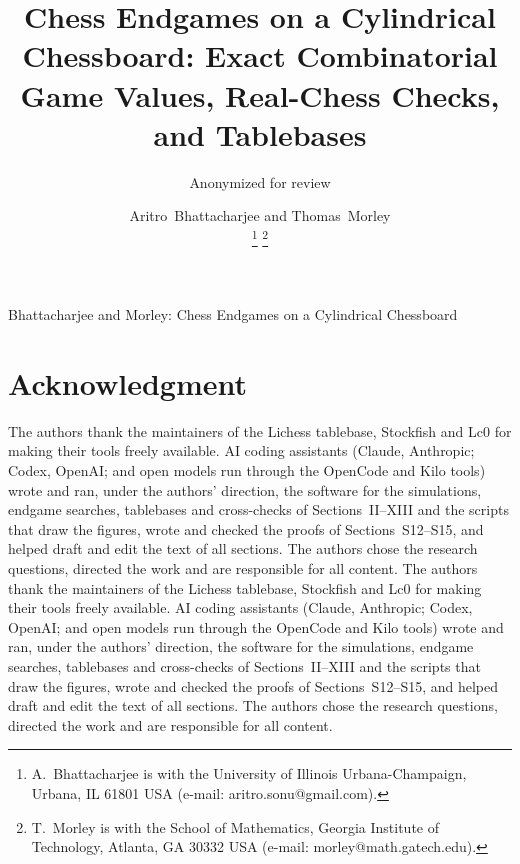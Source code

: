 \documentclass[journal]{IEEEtran}
\newif\ifsubmitted
\theoremstyle{ieeeplain}
\theoremstyle{ieeedef}
\begin{document}
\title{Chess Endgames on a Cylindrical Chessboard: Exact Combinatorial Game Values, Real-Chess Checks, and Tablebases}

\ifdefined\anonbuild
\author{Anonymized for review}
\else
\ifsubmitted
  \newcommand{\ieeenotice}{\thanks{This work has been submitted to the IEEE for possible publication.
    Copyright may be transferred without notice, after which this version may no longer be accessible.}}
\else
  \newcommand{\ieeenotice}{}
\fi
\author{Aritro~Bhattacharjee and Thomas~Morley%
\ieeenotice
\thanks{A.~Bhattacharjee is with the University of Illinois Urbana-Champaign, Urbana, IL 61801 USA (e-mail: aritro.sonu@gmail.com).}%
\thanks{T.~Morley is with the School of Mathematics, Georgia Institute of Technology, Atlanta, GA 30332 USA (e-mail: morley@math.gatech.edu).}}
%
{Bhattacharjee and Morley: Chess Endgames on a Cylindrical Chessboard}
\fi

\maketitle

















\raggedbottom
\section*{Acknowledgment}
\ifdefined\anonbuild
The authors thank
the maintainers of the Lichess tablebase, Stockfish and Lc0 for making their tools freely available. AI
coding assistants (Claude, Anthropic; Codex, OpenAI; and open models run through the OpenCode and Kilo tools)
wrote and ran, under the authors' direction, the software for the simulations, endgame searches, tablebases
and cross-checks of Sections~II--XIII and the scripts that draw the figures, wrote and checked the proofs of
Sections~S12--S15, and helped draft and edit the text of all sections. The authors chose the research questions, directed the work and are responsible for all
content.
\else
The authors thank
the maintainers of the Lichess tablebase, Stockfish and Lc0 for making their tools freely available. AI
coding assistants (Claude, Anthropic; Codex, OpenAI; and open models run through the OpenCode and Kilo tools)
wrote and ran, under the authors' direction, the software for the simulations, endgame searches, tablebases
and cross-checks of Sections~II--XIII and the scripts that draw the figures, wrote and checked the proofs of
Sections~S12--S15, and helped draft and edit the text of all sections. The authors chose the research questions, directed the work and are responsible for all
content.
\fi




\end{document}
